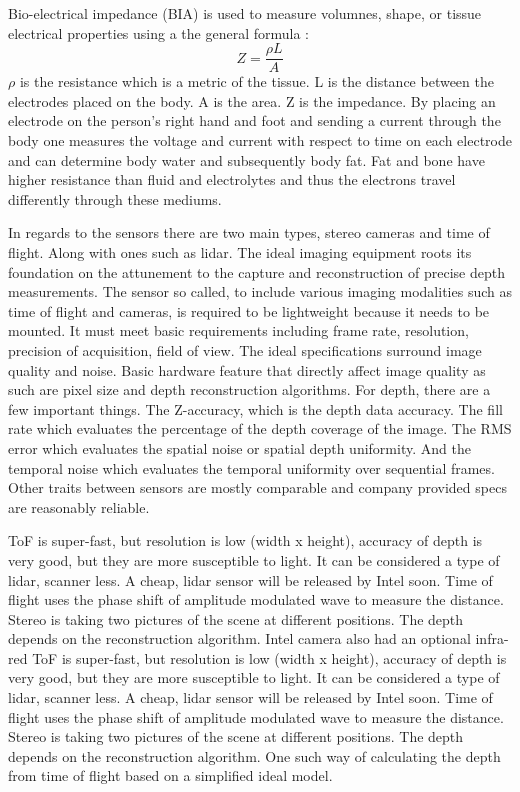 Bio-electrical impedance (BIA) is used to measure volumnes, shape, or tissue electrical properties using a the general formula \cite{jaffrin2008body}:
\begin{equation}
	Z = \frac{\rho L}{A}
\end{equation}
$\rho$ is the resistance which is a metric of the tissue. L is the distance between the electrodes placed on the body. A is the area. Z is the impedance. By placing an electrode on the person's right hand and foot and sending a current through the body one measures the voltage and current with respect to time on each electrode and can determine body water and subsequently body fat. Fat and bone have higher resistance than fluid and electrolytes and thus the electrons travel differently through these mediums.

In regards to the sensors there are two main types, stereo cameras and time of flight. Along with ones such as lidar. The ideal imaging equipment roots its foundation on the attunement to the capture and reconstruction of precise depth measurements. The sensor so called, to include various imaging
modalities such as time of flight and cameras, is required to be lightweight because it needs to be
mounted. It must meet basic requirements including frame rate, resolution, precision of
acquisition, field of view. The ideal specifications surround image quality and noise. Basic hardware feature that directly affect image quality as such are pixel size and depth reconstruction algorithms. For depth, there
are a few important things. The Z-accuracy, which is the depth data accuracy. The fill rate which
evaluates the percentage of the depth coverage of the image. The RMS error which evaluates the
spatial noise or spatial depth uniformity. And the temporal noise which evaluates the temporal
uniformity over sequential frames. Other traits between sensors are mostly comparable and
company provided specs are reasonably reliable.

ToF is super-fast, but resolution is low (width x height), accuracy of depth is very good, but they are more susceptible to light. It can be considered a type of lidar, scanner less.  A cheap, lidar sensor will be released by Intel soon. Time of flight uses the phase shift of amplitude modulated wave to measure the distance. Stereo is taking two pictures of the scene at different positions. The depth depends on the reconstruction algorithm. Intel camera also had an optional infra-red ToF is super-fast, but resolution is low (width x height), accuracy of depth is very good, but they are more susceptible to light. It can be considered a type of lidar, scanner less.  A cheap, lidar sensor will be released by Intel soon. Time of flight uses the phase shift of amplitude modulated wave to measure the distance. Stereo is taking two pictures of the scene at different positions. The depth depends on the reconstruction algorithm. One such way of calculating the depth from time of flight based on a simplified ideal model.


